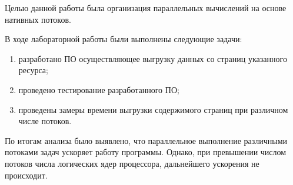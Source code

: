 
Целью данной работы была организация параллельных вычислений на основе нативных потоков.

В ходе лабораторной работы были выполнены следующие задачи:
\begin{enumerate}[label={\arabic*)}]
	\item разработано ПО осуществляющее выгрузку данных со страниц указанного ресурса;
	\item проведено тестирование разработанного ПО;
	\item проведены замеры времени выгрузки содержимого страниц при различном числе потоков.
\end{enumerate}

По итогам анализа было выявлено, что параллельное выполнение различными потоками задач ускоряет работу программы. Однако, при превышении числом потоков числа логических ядер процессора, дальнейшего ускорения не происходит.